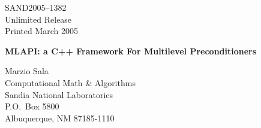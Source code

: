 \documentclass{article}[11pt]
\newcommand{\MLAPIns}  {{\sc MLAPI}}
\def\draft{%
\special{!userdict begin /bop-hook{gsave
200 30 translate 65 rotate
/Times-Roman findfont 216 scalefont setfont
0 0 moveto 0.9 setgray (DRAFT) show grestore}def end}
}
\begin{document}

\setcounter{page}{3}

\large


%
%
\begin{center}
SAND2005--1382 \\
Unlimited Release \\
Printed March 2005
\end{center}

\vspace{0.2in}

\begin{center}
{\Large {\bf \MLAPIns: a C++ Framework For Multilevel Preconditioners}}

\vspace*{0.8in}
Marzio  Sala \\
Computational Math \& Algorithms \\
Sandia National Laboratories\\
P.O.~Box 5800 \\
Albuquerque, NM 87185-1110
\vspace*{1in}

\end{center}
\end{document}
